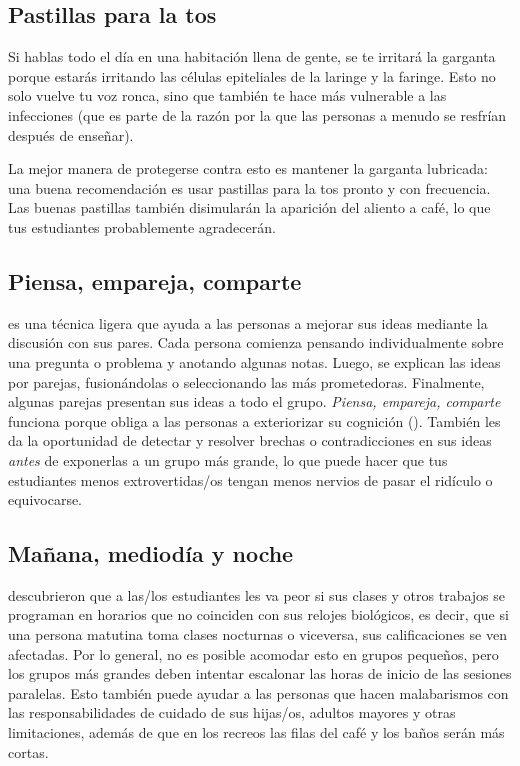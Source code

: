 \subsection*{Pastillas para la tos}

Si hablas todo el día en una habitación llena de gente,
se te irritará la garganta porque estarás irritando las células epiteliales de la laringe y la faringe.
Esto no solo vuelve tu voz ronca, sino que también te hace más vulnerable a las infecciones
(que es parte de la razón por la que las personas a menudo se resfrían después de enseñar).

La mejor manera de protegerse contra esto es mantener la garganta lubricada:
una buena recomendación es usar pastillas para la tos pronto y con frecuencia.
Las buenas pastillas también disimularán la aparición del aliento a café,
lo que tus estudiantes probablemente agradecerán.

\subsection*{Piensa, empareja, comparte}

 es una técnica ligera
que ayuda a las personas a mejorar sus ideas
mediante la discusión con sus pares.
Cada persona comienza pensando individualmente sobre una pregunta o problema
y anotando algunas notas.
Luego, se explican las ideas por parejas,
fusionándolas o seleccionando las más prometedoras.
Finalmente,
algunas parejas presentan sus ideas a todo el grupo.
\emph{Piensa, empareja, comparte} funciona porque obliga a las personas a exteriorizar su cognición
().
También les da la oportunidad de detectar y resolver brechas o contradicciones en sus ideas
\emph{antes} de exponerlas a un grupo más grande,
lo que puede hacer que tus estudiantes menos extrovertidas/os tengan menos nervios de pasar el ridículo o equivocarse.

\subsection*{Mañana, mediodía y noche}

\cite{Smar2018} descubrieron que
a las/los estudiantes les va peor
si sus clases y otros trabajos se programan en horarios que no coinciden con sus relojes biológicos,
es decir, que si una persona matutina toma clases nocturnas o viceversa,
sus calificaciones se ven afectadas.
Por lo general, no es posible acomodar esto en grupos pequeños,
pero los grupos más grandes deben intentar escalonar las horas de inicio de las sesiones paralelas.
Esto también puede ayudar a las personas que hacen malabarismos con las responsabilidades 
de cuidado de sus hijas/os, adultos mayores y otras limitaciones,
además de que en los recreos las filas del café y los baños serán más cortas.

